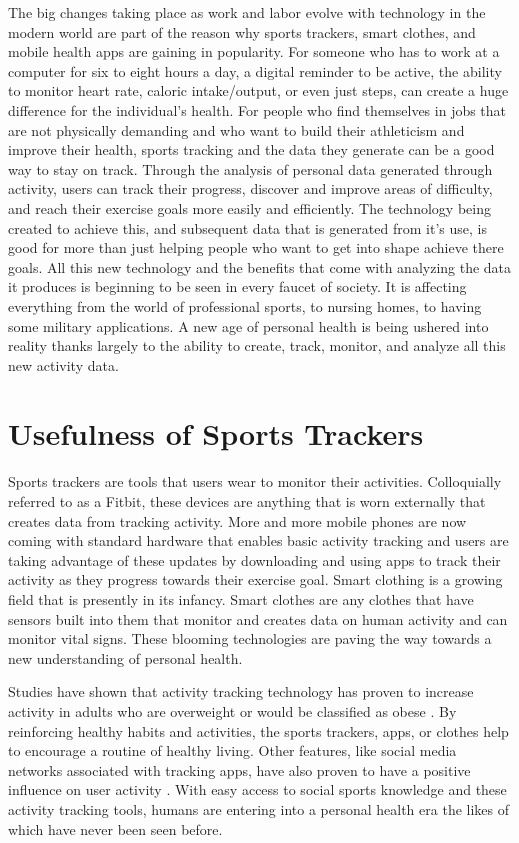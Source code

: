 \documentclass[sigconf]{acmart}
\begin{document}
The big changes taking place as work and labor evolve with technology in the modern world are part of the reason why sports trackers, smart clothes, and mobile health apps are gaining in popularity. For someone who has to work at a computer for six to eight hours a day, a digital reminder to be active, the ability to monitor heart rate, caloric intake/output, or even just steps, can create a huge difference for the individual's health. For people who find themselves in jobs that are not physically demanding and who want to build their athleticism and improve their health, sports tracking and the data they generate can be a good way to stay on track. Through the analysis of personal data generated through activity, users can track their progress, discover and improve areas of difficulty, and reach their exercise goals more easily and efficiently. The technology being created to achieve this, and subsequent data that is generated from it's use, is good for more than just helping people who want to get into shape achieve there goals. All this new technology and the benefits that come with analyzing the data it produces is beginning to be seen in every faucet of society. It is affecting everything from the world of professional sports, to nursing homes, to having some military applications. A new age of personal health is being ushered into reality thanks largely to the ability to create, track, monitor, and analyze all this new activity data.

\section{Usefulness of Sports Trackers}

Sports trackers are tools that users wear to monitor their activities. Colloquially referred to as a Fitbit, these devices are anything that is worn externally that creates data from tracking activity. More and more mobile phones are now coming with standard hardware that enables basic activity tracking and users are taking advantage of these updates by downloading and using apps to track their activity as they progress towards their exercise goal. Smart clothing is a growing field that is presently in its infancy. Smart clothes are any clothes that have sensors built into them that monitor and creates data on human activity and can monitor vital signs. These blooming technologies are paving the way towards a new understanding of personal health.

Studies have shown that activity tracking technology has proven to increase activity in adults who are overweight or would be classified as obese \cite{devries2016}. By reinforcing healthy habits and activities, the sports trackers, apps, or clothes help to encourage a routine of healthy living. Other features, like social media networks associated with tracking apps, have also proven to have a positive influence on user activity \cite{ojala2010}. With easy access to social sports knowledge and these activity tracking tools, humans are entering into a personal health era the likes of which have never been seen before.
\end{document}

